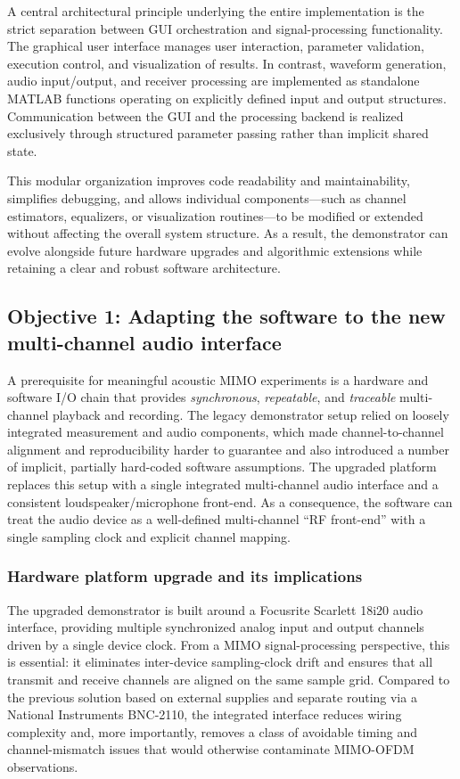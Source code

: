 A central architectural principle underlying the entire implementation is the strict separation between GUI orchestration and signal-processing functionality. The graphical user interface manages user interaction, parameter validation, execution control, and visualization of results. In contrast, waveform generation, audio input/output, and receiver processing are implemented as standalone MATLAB functions operating on explicitly defined input and output structures. Communication between the GUI and the processing backend is realized exclusively through structured parameter passing rather than implicit shared state. 

This modular organization improves code readability and maintainability, simplifies debugging, and allows individual components—such as channel estimators, equalizers, or visualization routines—to be modified or extended without affecting the overall system structure. As a result, the demonstrator can evolve alongside future hardware upgrades and algorithmic extensions while retaining a clear and robust software architecture.
\subsection{Objective 1: Adapting the software to the new multi-channel audio interface}
\label{sec:hw_adaptation}

A prerequisite for meaningful acoustic MIMO experiments is a hardware and software I/O chain that provides \emph{synchronous}, \emph{repeatable}, and \emph{traceable} multi-channel playback and recording. The legacy demonstrator setup relied on loosely integrated measurement and audio components, which made channel-to-channel alignment and reproducibility harder to guarantee and also introduced a number of implicit, partially hard-coded software assumptions. The upgraded platform replaces this setup with a single integrated multi-channel audio interface and a consistent loudspeaker/microphone front-end. As a consequence, the software can treat the audio device as a well-defined multi-channel ``RF front-end'' with a single sampling clock and explicit channel mapping.

\subsubsection{Hardware platform upgrade and its implications}
\label{sec:hw_upgrade}

The upgraded demonstrator is built around a Focusrite Scarlett 18i20 audio interface, providing multiple synchronized analog input and output channels driven by a single device clock. From a MIMO signal-processing perspective, this is essential: it eliminates inter-device sampling-clock drift and ensures that all transmit and receive channels are aligned on the same sample grid. Compared to the previous solution based on external supplies and separate routing via a National Instruments BNC-2110, the integrated interface reduces wiring complexity and, more importantly, removes a class of avoidable timing and channel-mismatch issues that would otherwise contaminate MIMO-OFDM observations.

